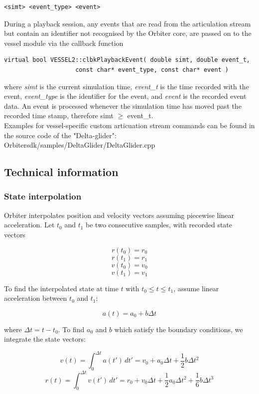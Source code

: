 \documentclass[Orbiter Technical Reference.tex]{subfiles}
\begin{document}
\begin{lstlisting}[language=OSFS]
<simt> <event_type> <event>
\end{lstlisting}

\noindent
During a playback session, any events that are read from the articulation stream but contain an identifier not recognised by the Orbiter core, are passed on to the vessel module via the callback function

\begin{lstlisting}
virtual bool VESSEL2::clbkPlaybackEvent( double simt, double event_t,
					const char* event_type, const char* event )
\end{lstlisting}

\noindent
where \textit{simt} is the current simulation time, \textit{event\_t} is the time recorded with the event, \textit{event\_type} is the identifier for the event, and \textit{event} is the recorded event data. An event is processed whenever the simulation time has moved past the recorded time stamp, therefore simt $\geq$ event\_t.\\
Examples for vessel-specific custom articuation stream commands can be found in the source code of the "Delta-glider": Orbitersdk/samples/DeltaGlider/DeltaGlider.cpp

\subsection{Technical information}
\subsubsection{State interpolation}
Orbiter interpolates position and velocity vectors assuming piecewise linear acceleration. Let $t_{0}$ and $t_{1}$ be two consecutive samples, with recorded state vectors

\[ r(t_{0}) = r_{0} \]
\[ r(t_{1}) = r_{1} \]
\[ v(t_{0}) = v_{0} \]
\[ v(t_{1}) = v_{1} \]

\noindent
To find the interpolated state at time $t$ with $t_{0} \leq t \leq t_{1}$, assume linear acceleration between $t_{0}$ and $t_{1}$:

\[ a(t) = a_{0} + b\Delta t \]

\noindent
where $\Delta t = t - t_{0}$. To find $a_{0}$ and $b$ which satisfy the boundary conditions, we integrate the state vectors:

\[ v(t) = \int_{0}^{\Delta t} a(t') \,dt' = v_{0} + a_{0} \Delta t + \frac{1}{2}b \Delta t^{2} \]
\[ r(t) = \int_{0}^{\Delta t} v(t') \,dt' = r_{0} + v_{0} \Delta t + \frac{1}{2} a_{0} \Delta t^{2} + \frac{1}{6} b \Delta t^{3} \]
\end{document}
